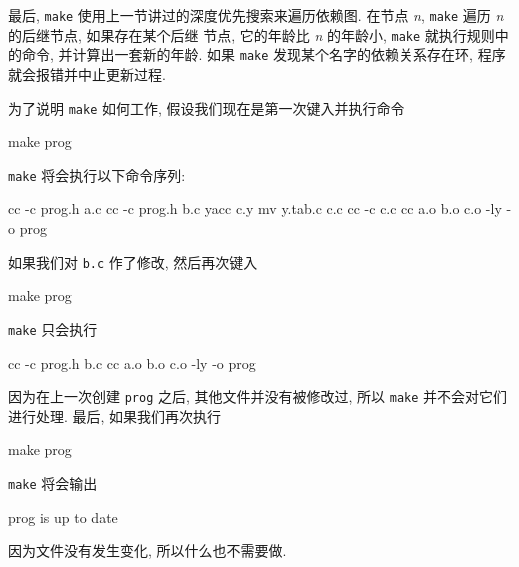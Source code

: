 最后, \texttt{make} 使用上一节讲过的深度优先搜索来遍历依赖图. 在节点
\textit{n}, \texttt{make} 遍历 \textit{n} 的后继节点, 如果存在某个后继
节点, 它的年龄比 \textit{n} 的年龄小, \texttt{make} 就执行规则中的命令,
并计算出一套新的年龄. 如果 \texttt{make} 发现某个名字的依赖关系存在环,
程序就会报错并中止更新过程.

为了说明 \texttt{make} 如何工作, 假设我们现在是第一次键入并执行命令
\begin{shell}
    make prog
\end{shell}
\texttt{make} 将会执行以下命令序列:
\begin{shell}
    cc -c prog.h a.c
    cc -c prog.h b.c
    yacc c.y
    mv y.tab.c c.c
    cc -c c.c
    cc a.o b.o c.o -ly -o prog
\end{shell}
如果我们对 \texttt{b.c} 作了修改, 然后再次键入
\begin{shell}
    make prog
\end{shell}
\texttt{make} 只会执行
\begin{shell}
    cc -c prog.h b.c
    cc a.o b.o c.o -ly -o prog
\end{shell}
因为在上一次创建 \texttt{prog} 之后, 其他文件并没有被修改过, 所以 
\texttt{make} 并不会对它们进行处理. 最后, 如果我们再次执行
\begin{shell}
    make prog
\end{shell}
\texttt{make} 将会输出
\begin{shell}
    prog is up to date
\end{shell}
因为文件没有发生变化, 所以什么也不需要做.
